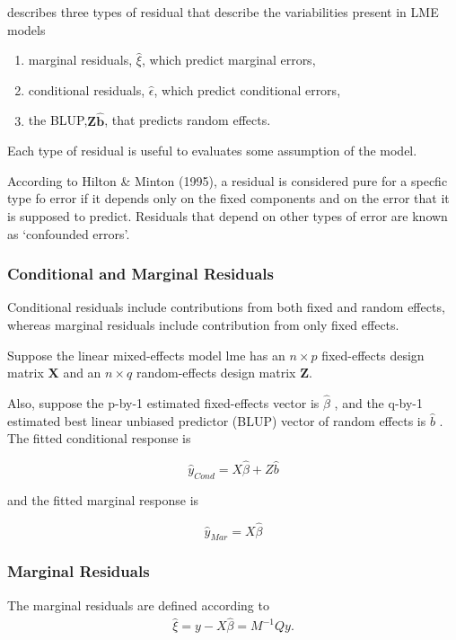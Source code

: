 \documentclass[12pt, a4paper]{report}
\theoremstyle{plain}
\theoremstyle{definition}
\theoremstyle{remark}
\begin{document}
	
	\citet{pb} describes three types of residual that describe the variabilities
	present in LME models
	\begin{enumerate}
		\item marginal residuals, $\hat{\xi}$, which predict marginal errors,
		\item conditional residuals, $\hat{\epsilon}$, which predict conditional errors,
		\item the BLUP,$\boldsymbol{Z\hat{b}}$, that predicts random effects.
	\end{enumerate}
	Each type of residual is useful to evaluates some assumption of the model.
	
	
	According to Hilton \& Minton (1995), a residual is considered pure for a specfic type fo error
	if it depends only on the fixed components and on the error that it is supposed to predict.
	Residuals that depend on other types of error are known as `confounded errors'.
	
	
	
	
	\subsubsection{Conditional and Marginal Residuals}
	Conditional residuals include contributions from both fixed and random effects, whereas marginal residuals include contribution from only fixed effects.
	
	Suppose the linear mixed-effects model lme has an $n \times p$ fixed-effects design matrix $\boldsymbol{X}$ and an $n \times q$ random-effects design matrix $\boldsymbol{Z}$. 
	
	Also, suppose the p-by-1 estimated fixed-effects vector is $\hat{\beta}$ , and the q-by-1 estimated best linear unbiased predictor (BLUP) 
	vector of random effects is $\hat{b}$ . The fitted conditional response is
	
	\[ \hat{y}_{Cond} = X \hat{\beta} + Z \hat{b} \]
	
	and the fitted marginal response is
	
	
	\[ \hat{y}_{Mar} = X \hat{\beta} \]
	
	\subsubsection{Marginal Residuals}
	The marginal residuals are defined according to
	\begin{eqnarray*}
		\hat{\xi} = y - X\hat{\beta} = M^{-1}Qy. \\\nonumber
	\end{eqnarray*}
	
\end{document}
